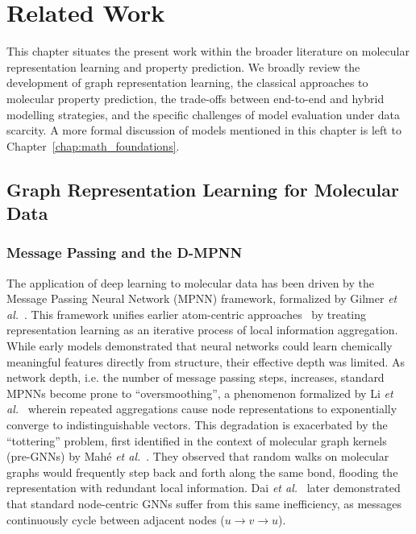 
\chapter{Related Work}
\label{chap:related_work}
This chapter situates the present work within the broader literature on molecular representation learning and property prediction. We broadly review the development of graph representation learning, the classical approaches to molecular property prediction, the trade-offs between end-to-end and hybrid modelling strategies, and the specific challenges of model evaluation under data scarcity. A more formal discussion of models mentioned in this chapter is left to Chapter~\ref{chap:math_foundations}.

\section{Graph Representation Learning for Molecular Data}

\subsection{Message Passing and the D-MPNN}
The application of deep learning to molecular data has been driven by the Message Passing Neural Network (MPNN) framework, formalized by Gilmer \textit{et al.}~\cite{gilmer2017neural}. This framework unifies earlier atom-centric approaches~\cite{duvenaud2015convolutional, kearnes2016molecular} by treating representation learning as an iterative process of local information aggregation. While early models demonstrated that neural networks could learn chemically meaningful features directly from structure, their effective depth was limited. As network depth, i.e. the number of message passing steps, increases, standard MPNNs become prone to ``oversmoothing'', a phenomenon formalized by Li \textit{et al.}~\cite{li2018deeper} wherein repeated aggregations cause node representations to exponentially converge to indistinguishable vectors. 
This degradation is exacerbated by the ``tottering'' problem, first identified in the context of molecular graph kernels (pre-GNNs) by Mahé \textit{et al.}~\cite{mahe2004extensions}. They observed that random walks on molecular graphs would frequently step back and forth along the same bond, flooding the representation with redundant local information. Dai \textit{et al.}~\cite{dai2016discriminative} later demonstrated that standard node-centric GNNs suffer from this same inefficiency, as messages continuously cycle between adjacent nodes ($u \to v \to u$).


